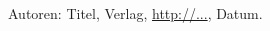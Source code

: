 \begin{thebibliography}{99}

 Autoren: Titel, Verlag, \url{http://...}, Datum.

\end{thebibliography}

